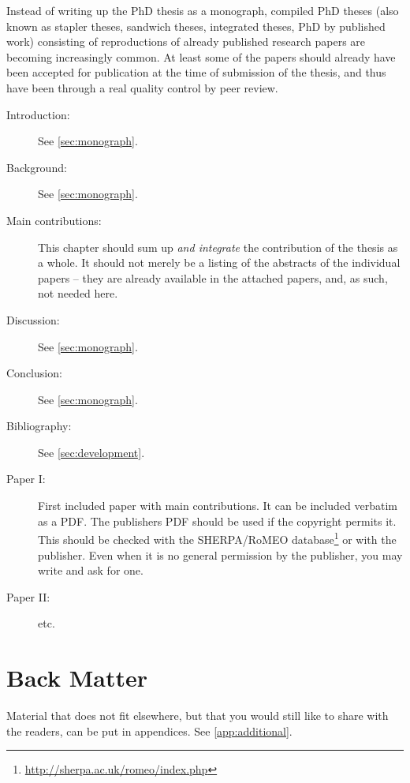 Instead of writing up the PhD thesis as a monograph, compiled PhD theses (also known as stapler theses, sandwich theses, integrated theses, PhD by published work) consisting of reproductions of already published research papers are becoming increasingly common. At least some of the papers should already have been accepted for publication at the time of submission of the thesis, and thus have been through a real quality control by peer review.

\begin{description}
    \item[Introduction:] See \cref{sec:monograph}.
    \item[Background:] See \cref{sec:monograph}.
    \item[Main contributions:] This chapter should sum up \emph{and integrate} the contribution of the thesis as a whole. It should not merely be a listing of the abstracts of the individual papers – they are already available in the attached papers, and, as such, not needed here.
    \item[Discussion:] See \cref{sec:monograph}.
    \item[Conclusion:] See \cref{sec:monograph}.
    \item[Bibliography:] See \cref{sec:development}.
    \item[Paper I:] First included paper with main contributions. It can be included verbatim as a PDF. The publishers PDF should be used if the copyright permits it. This should be checked with the SHERPA/RoMEO database\footnote{\url{http://sherpa.ac.uk/romeo/index.php}} or with the publisher. Even when it is no general permission by the publisher, you may write and ask for one.
    \item[Paper II:] etc.
\end{description}



\section{Back Matter}

Material that does not fit elsewhere, but that you would still like to share with the readers, can be put in appendices. See \cref{app:additional}.
